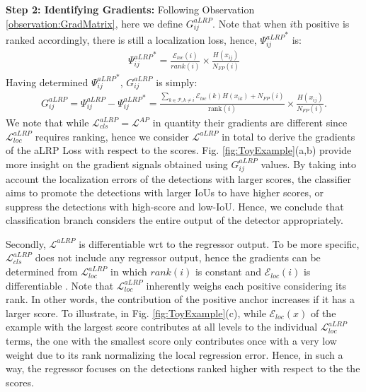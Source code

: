 \documentclass{article}
\begin{document}
{\textbf{Step 2: Identifying Gradients:} Following Observation \ref{observation:GradMatrix}, here we define $G_{ij} ^ {aLRP}$. Note that when $i$th positive is ranked accordingly, there is still a localization loss, hence, ${\Psi^{aLRP}_{ij}}^*$ is:
\begin{align}
    {\Psi^{aLRP}_{ij}}^* = \frac{ \mathcal{E}_{loc}(i)}{rank(i)} \times \frac{H(x_{ij})}{N_{FP}(i)}
\end{align}
Having determined ${\Psi^{aLRP}_{ij}}^*$, $G_{ij} ^{aLRP}$ is simply:
\begin{align}
    \label{eq:aLRPClassificationGrads}
    G_{ij} ^{aLRP} = \Psi^{aLRP}_{ij} - {\Psi^{aLRP}_{ij}}^* 
    = \frac{ \sum \limits_{k \in \mathcal{P}, k \neq i}  \mathcal{E}_{loc}(k) H(x_{ik}) + N_{FP}(i) }{\mathrm{rank}(i)} \times \frac{H(x_{ij})}{N_{FP}(i)}.
\end{align}
We note that while $\mathcal{L}^{aLRP}_{cls}=\mathcal{L}^{AP}$ in quantity their gradients are different since $\mathcal{L}^{aLRP}_{loc}$ requires ranking, hence we consider $\mathcal{L}^{aLRP}$ in total to derive the gradients of the aLRP Loss with respect to the scores. Fig. \ref{fig:ToyExample}(a,b) provide more insight on the gradient signals obtained using $G_{ij} ^{aLRP}$ values. By taking into account the localization errors of the detections with larger scores, the classifier aims to promote the detections with larger IoUs to have higher scores, or suppress the detections with high-score and low-IoU. Hence, we conclude that classification branch considers the entire output of the detector appropriately.

Secondly, $\mathcal{L}^{aLRP}$ is differentiable wrt to the regressor output. To be more specific, $\mathcal{L}^{aLRP}_{cls}$ does not include any regressor output, hence the gradients can be determined from $\mathcal{L}^{aLRP}_{loc}$ in which $rank(i)$ is constant and $\mathcal{E}_{loc}(i)$ is differentiable \cite{UnitBox,GIoULoss,DIoULoss}. Note that $\mathcal{L}^{aLRP}_{loc}$ inherently weighs each positive considering its rank. In other words, the contribution of the positive anchor increases if it has a larger score. To illustrate, in Fig. \ref{fig:ToyExample}(c), while $\mathcal{E}_{loc}(x)$ of the example with the largest score contributes at all levels to the individual $\mathcal{L}^{aLRP}_{loc}$ terms, the one with the smallest score only contributes once with a very low weight due to its rank normalizing the local regression error. Hence, in such a way, the regressor focuses on the detections ranked higher with respect to the the scores.
 




}
\end{document}

